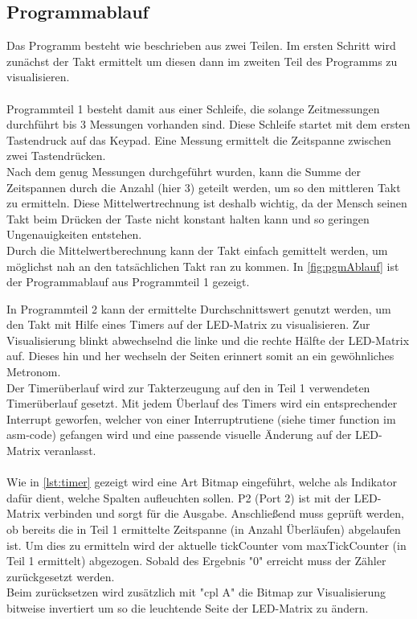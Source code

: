 \documentclass[a4paper, 12pt]{scrartcl}
\begin{document}
\begin{onehalfspace}
\subsection{Programmablauf}
Das Programm besteht wie beschrieben aus zwei Teilen. Im ersten Schritt wird zunächst der Takt ermittelt um diesen dann im zweiten Teil des Programms zu visualisieren.
\\
\\
Programmteil 1 besteht damit aus einer Schleife, die solange Zeitmessungen durchführt bis 3 Messungen vorhanden sind. Diese Schleife startet mit dem ersten Tastendruck auf das Keypad. Eine Messung ermittelt die Zeitspanne zwischen zwei Tastendrücken. 
\\
Nach dem genug Messungen durchgeführt wurden, kann die Summe der Zeitspannen durch die Anzahl (hier 3) geteilt werden, um so den mittleren Takt zu ermitteln. Diese Mittelwertrechnung ist deshalb wichtig, da der Mensch seinen Takt beim Drücken der Taste nicht konstant halten kann und so geringen Ungenauigkeiten entstehen.
\\
Durch die Mittelwertberechnung kann der Takt einfach gemittelt werden, um möglichst nah an den tatsächlichen Takt ran zu kommen. In \autoref{fig:pgmAblauf} ist der Programmablauf aus Programmteil 1 gezeigt.

In Programmteil 2 kann der ermittelte Durchschnittswert genutzt werden, um den Takt mit Hilfe eines Timers auf der LED-Matrix zu visualisieren. Zur Visualisierung blinkt abwechselnd die linke und die rechte Hälfte der LED-Matrix auf. Dieses hin und her wechseln der Seiten erinnert somit an ein gewöhnliches Metronom.
\\  
Der Timerüberlauf wird zur Takterzeugung auf den in Teil 1 verwendeten Timerüberlauf gesetzt. Mit jedem Überlauf des Timers wird ein entsprechender Interrupt geworfen, welcher von einer Interruptrutiene (siehe timer function im asm-code) gefangen wird und eine passende visuelle Änderung auf der LED-Matrix veranlasst.
\\
\\
Wie in \autoref{lst:timer} gezeigt wird eine Art Bitmap eingeführt, welche als Indikator dafür dient, welche Spalten aufleuchten sollen. P2 (Port 2) ist mit der LED-Matrix verbinden und sorgt für die Ausgabe. Anschließend muss geprüft werden, ob bereits die in Teil 1 ermittelte Zeitspanne (in Anzahl Überläufen) abgelaufen ist. Um dies zu ermitteln wird der aktuelle tickCounter vom maxTickCounter (in Teil 1 ermittelt) abgezogen. Sobald des Ergebnis "0" erreicht muss der Zähler zurückgesetzt werden.
\\
Beim zurücksetzen wird zusätzlich mit "cpl A" die Bitmap zur Visualisierung bitweise invertiert um so die leuchtende Seite der LED-Matrix zu ändern.


\end{onehalfspace}
\end{document}

